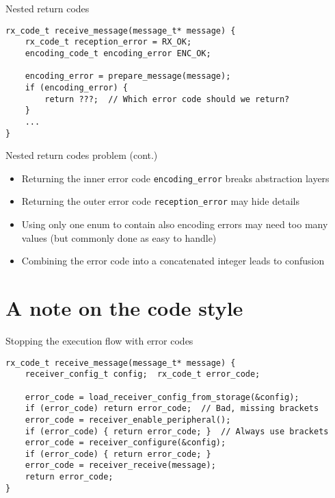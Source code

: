 \documentclass[aspectratio=169,14pt]{beamer}
\begin{document}
\begin{frame}[fragile]{Nested return codes }
\begin{lstlisting}[style=cstyle]
rx_code_t receive_message(message_t* message) {
    rx_code_t reception_error = RX_OK;
    encoding_code_t encoding_error ENC_OK;
    
    encoding_error = prepare_message(message);
    if (encoding_error) {
        return ???;  // Which error code should we return?
    }
    ...
}
\end{lstlisting}
\end{frame}



\begin{frame}{Nested return codes problem (cont.)}
\begin{itemize}
    \item Returning the inner error code \texttt{encoding\_error} breaks abstraction layers
    \item Returning the outer error code \texttt{reception\_error} may hide details
    \item Using only one enum to contain also encoding errors may need too many values (but commonly done as easy to handle)
    \item Combining the error code into a concatenated integer leads to confusion
\end{itemize}
\end{frame}





\section{A note on the code style}

\begin{frame}[fragile]{Stopping the execution flow with error codes}
\begin{lstlisting}[style=cstyle]
rx_code_t receive_message(message_t* message) {
    receiver_config_t config;  rx_code_t error_code;
    
    error_code = load_receiver_config_from_storage(&config);
    if (error_code) return error_code;  // Bad, missing brackets
    error_code = receiver_enable_peripheral();
    if (error_code) { return error_code; }  // Always use brackets
    error_code = receiver_configure(&config);
    if (error_code) { return error_code; }
    error_code = receiver_receive(message);
    return error_code;
}
\end{lstlisting}
\end{frame}
\end{document}
